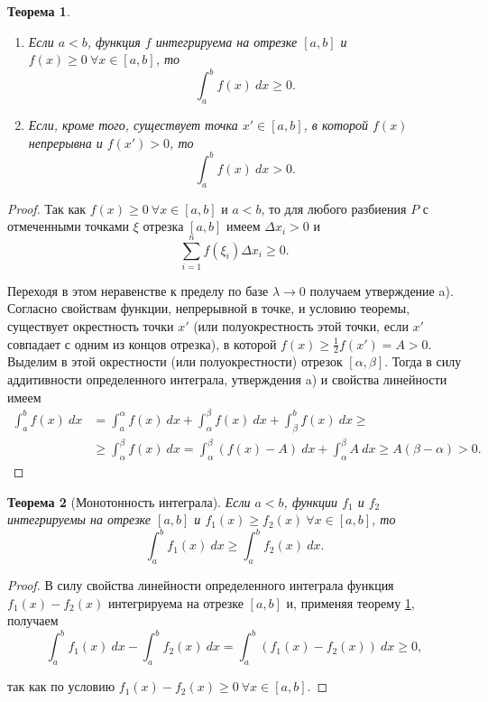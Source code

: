 \documentclass[12pt]{report}
\numberwithin{equation}{section}
\newtheorem{theorem}{Теорема}[section]
\begin{document}
\begin{theorem} \label{th:8:1}
~ %
\begin{enumerate}
    \item[a)] Если $a < b$, функция $f$ интегрируема на отрезке $[a,b]$ и $f(x) \geqslant 0~ \forall x \in [a,b]$, то
    \[ \int_a^b f(x)~dx \geqslant 0.\]
    \item[b)] Если, кроме того, существует точка $x' \in [a,b]$, в которой $f(x)$ непрерывна и $f(x') > 0$, то
    \[ \int_a^b f(x)~dx > 0.\]
\end{enumerate}
\end{theorem}
\begin{proof}
Так как $f(x) \geqslant 0 ~ \forall x \in [a,b]$ и $a < b$, то для любого разбиения $P$ с отмеченными точками $\xi$ отрезка $[a,b]$ имеем $\Delta x_i > 0$ и
\[ \sum_{i=1}^n f(\xi_i) \Delta x_i \geqslant 0. \]

Переходя в этом неравенстве к пределу по базе $\lambda \to 0$ получаем утверждение a).\\

Согласно свойствам функции, непрерывной в точке, и условию теоремы, существует окрестность точки $x'$ (или полуокрестность этой точки, если $x'$ совпадает с одним из концов отрезка), в которой $f(x) \geqslant \frac{1}{2} f(x') = A > 0$. Выделим в этой окрестности (или полуокрестности) отрезок $[\alpha, \beta]$. Тогда в силу аддитивности определенного интеграла, утверждения a) и свойства линейности имеем
\[ 
\begin{aligned}
\int_a^b f(x)~dx &= \int_a^{\alpha} f(x)~dx + \int_{\alpha}^{\beta} f(x)~dx + \int_{\beta}^b f(x)~dx \geqslant\\
&\geqslant \int_{\alpha}^{\beta} f(x)~dx = \int_{\alpha}^{\beta} (f(x) - A)~dx + \int_{\alpha}^{\beta} A~dx \geqslant A(\beta - \alpha) > 0.
\end{aligned}
\]
\end{proof}
\begin{theorem}[Монотонность интеграла] \label{th:8:2}
Если $a < b$, функции $f_1$ и $f_2$ интегрируемы на отрезке $[a,b]$ и $f_1(x) \geqslant f_2(x) ~\forall x \in [a,b]$, то 
\[ \int_a^{b} f_1(x)~dx \geqslant \int_a^b f_2(x)~dx.\]
\end{theorem}
\begin{proof}
В силу свойства линейности определенного интеграла функция $f_1(x) - f_2(x)$ интегрируема на отрезке $[a,b]$ и, применяя теорему \ref{th:8:1}, получаем
\[ \int_a^b f_1(x)~dx - \int_a^b f_2 (x)~dx = \int_a^b (f_1(x) - f_2(x))~dx \geqslant 0,\]

так как по условию $f_1(x) - f_2(x) \geqslant 0~\forall x \in [a,b]$.
\end{proof}
\end{document}

